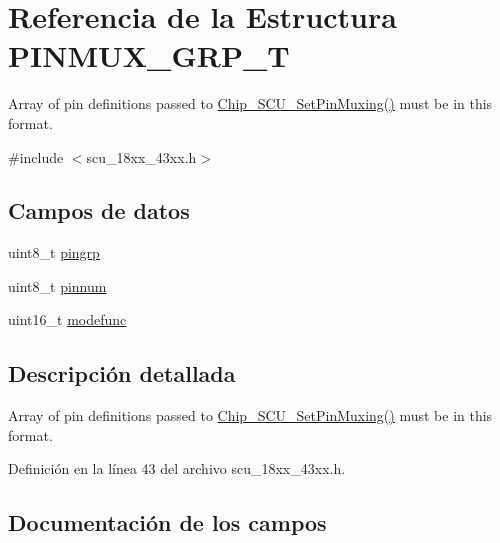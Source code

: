 \hypertarget{struct_p_i_n_m_u_x___g_r_p___t}{}\section{Referencia de la Estructura P\+I\+N\+M\+U\+X\+\_\+\+G\+R\+P\+\_\+T}
\label{struct_p_i_n_m_u_x___g_r_p___t}


Array of pin definitions passed to \hyperlink{group___s_c_u__18_x_x__43_x_x_ga118ccc4ab5b115c5e8c7ce457eb85536}{Chip\+\_\+\+S\+C\+U\+\_\+\+Set\+Pin\+Muxing()} must be in this format.  




{\ttfamily \#include $<$scu\+\_\+18xx\+\_\+43xx.\+h$>$}

\subsection*{Campos de datos}
\begin{DoxyCompactItemize}
\item 
uint8\+\_\+t \hyperlink{struct_p_i_n_m_u_x___g_r_p___t_a0b762be8adefddb8a080e6e53a718d01}{pingrp}
\item 
uint8\+\_\+t \hyperlink{struct_p_i_n_m_u_x___g_r_p___t_a2563102f3aa4b35fb8da7c26ff16e99d}{pinnum}
\item 
uint16\+\_\+t \hyperlink{struct_p_i_n_m_u_x___g_r_p___t_ad895e2c3f623e8fc7b52865608eb4101}{modefunc}
\end{DoxyCompactItemize}


\subsection{Descripción detallada}
Array of pin definitions passed to \hyperlink{group___s_c_u__18_x_x__43_x_x_ga118ccc4ab5b115c5e8c7ce457eb85536}{Chip\+\_\+\+S\+C\+U\+\_\+\+Set\+Pin\+Muxing()} must be in this format. 

Definición en la línea 43 del archivo scu\+\_\+18xx\+\_\+43xx.\+h.



\subsection{Documentación de los campos}
